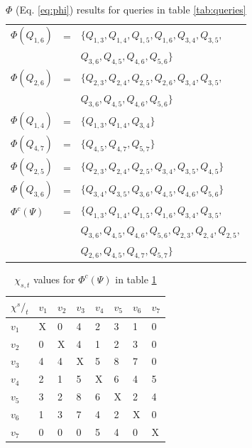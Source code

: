 \begin{table}
\begin{tabular}{lcp{}}
$\Phi(Q_{1,6})$ &= 	& $\{Q_{1,3},Q_{1,4},Q_{1,5},Q_{1,6},Q_{3,4},Q_{3,5},$\\
		 &	& $Q_{3,6},Q_{4,5},Q_{4,6},Q_{5,6}\}$ \\
$\Phi(Q_{2,6})$ &=  	& $\{Q_{2,3},Q_{2,4},Q_{2,5},Q_{2,6},Q_{3,4},Q_{3,5},$ \\
		 &	& $Q_{3,6},Q_{4,5},Q_{4,6},Q_{5,6}\}$ \\
$\Phi(Q_{1,4})$ &=  	& $\{Q_{1,3},Q_{1,4},Q_{3,4}\}$ \\
$\Phi(Q_{4,7})$ &=  	& $\{Q_{4,5},Q_{4,7},Q_{5,7}\}$ \\
$\Phi(Q_{2,5})$ &=  	& $\{Q_{2,3},Q_{2,4},Q_{2,5},Q_{3,4},Q_{3,5},Q_{4,5}\}$ \\
$\Phi(Q_{3,6})$ &=  	& $\{Q_{3,4},Q_{3,5},Q_{3,6},Q_{4,5},Q_{4,6},Q_{5,6}\}$ \\\hline
$\Phi^c(\Psi)$ 	 &=  	& $\{Q_{1,3},Q_{1,4},Q_{1,5},Q_{1,6},Q_{3,4},Q_{3,5},$ \\
		 &	& $Q_{3,6},Q_{4,5},Q_{4,6},Q_{5,6},Q_{2,3},Q_{2,4},Q_{2,5},$ \\
		 &	& $Q_{2,6},Q_{4,5},Q_{4,7},Q_{5,7}\}$  \\
\end{tabular}
\caption{$\Phi$ (Eq. \ref{eq:phi}) results for queries in table \ref{tab:queries}}
\label{tab:chi}
\end{table}

\begin{table}
\center
\begin{tabular}{|l||l|l|l|l|l|l|l|}
\textbf{$\chi {^s/_t}$}	& $v_1$	& $v_2$	& $v_3$	& $v_4$	& $v_5$	& $v_6$	& $v_7$ \\\hline
$v_1$			& X	& 0	& 4	& 2	& 3	& 1	& 0	 \\
$v_2$			& 0	& X	& 4	& 1	& 2	& 3	& 0	 \\
$v_3$			& 4	& 4	& X	& 5	& 8	& 7	& 0	 \\
$v_4$			& 2	& 1	& 5	& X	& 6	& 4	& 5	 \\
$v_5$			& 3	& 2	& 8	& 6	& X	& 2	& 4	 \\
$v_6$			& 1	& 3	& 7	& 4	& 2	& X	& 0	 \\
$v_7$			& 0	& 0	& 0	& 5	& 4	& 0	& X	 \\
\end{tabular}
\caption{$\chi_{s,t}$ values for $\Phi^c(\Psi)$ in table \ref{tab:chi}}
\label{tab:freq}
\end{table}



